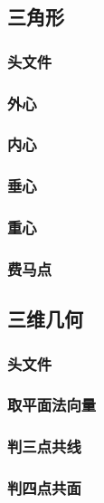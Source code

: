 \subsection{三角形}
\subsubsection{头文件}

\subsubsection{外心}

\subsubsection{内心}

\subsubsection{垂心}

\subsubsection{重心}

\subsubsection{费马点}


\subsection{三维几何}
\subsubsection{头文件}

\subsubsection{取平面法向量}

\subsubsection{判三点共线}

\subsubsection{判四点共面}

